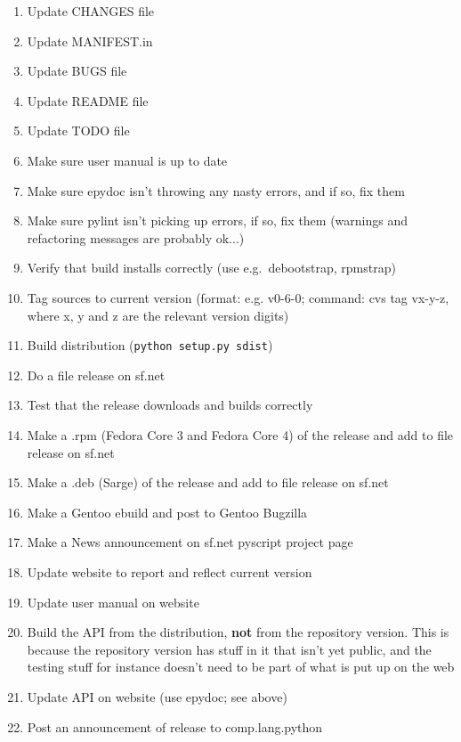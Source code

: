 \documentclass[12pt,a4paper]{article}
\begin{document}
\begin{enumerate}
\item Update CHANGES file
\item Update MANIFEST.in
\item Update BUGS file
\item Update README file
\item Update TODO file
\item Make sure user manual is up to date
\item Make sure epydoc isn't throwing any nasty errors, and if so, fix them
\item Make sure pylint isn't picking up errors, if so, fix them (warnings
and refactoring messages are probably ok...)
\item Verify that build installs correctly (use e.g.~debootstrap, rpmstrap)
\item Tag sources to current version (format: e.g. v0-6-0; command: cvs tag
vx-y-z, where x, y and z are the relevant version digits)
\item Build distribution (\texttt{python setup.py sdist})
\item Do a file release on sf.net
\item Test that the release downloads and builds correctly
\item Make a .rpm (Fedora Core 3 and Fedora Core 4) of the release and 
add to file release on sf.net
\item Make a .deb (Sarge) of the release and add to file release on sf.net
\item Make a Gentoo ebuild and post to Gentoo Bugzilla
\item Make a News announcement on sf.net pyscript project page
\item Update website to report and reflect current version
\item Update user manual on website
\item Build the API from the distribution, \textbf{not} from the repository 
version.  This is because the repository version has stuff in it that isn't
yet public, and the testing stuff for instance doesn't need to be part of
what is put up on the web
\item Update API on website (use epydoc; see above)
\item Post an announcement of release to comp.lang.python
\end{enumerate}
\end{document}
